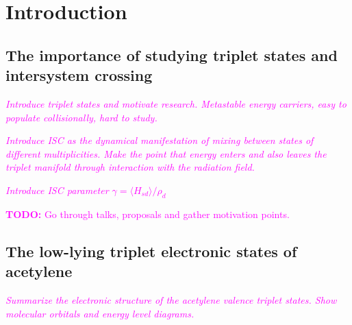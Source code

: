 \documentclass[12pt]{mitthesis}
\newcommand{\TODO} [1]{\textcolor{magenta}{\textbf{TODO:} #1}}
\newcommand{\POINT}[1]{\textcolor{magenta}{\emph{#1}}}
\begin{document}
\tableofcontents
\clearpage

\chapter{Introduction}

\section{The importance of studying triplet states and intersystem
  crossing}

\POINT{Introduce triplet states and motivate research. Metastable
  energy carriers, easy to populate collisionally, hard to study.}

\POINT{Introduce ISC as the dynamical manifestation of mixing between
  states of different multiplicities. Make the point that energy
  enters and also leaves the triplet manifold through interaction with
  the radiation field.}

\POINT{Introduce ISC parameter $\gamma = \langle H_{sd} \rangle /
  \rho_d$}

\TODO{Go through talks, proposals and gather motivation points.}

\section{The low-lying triplet electronic states of acetylene}

\POINT{Summarize the electronic structure of the acetylene valence
  triplet states.  Show molecular orbitals and energy level diagrams.}
\end{document}
